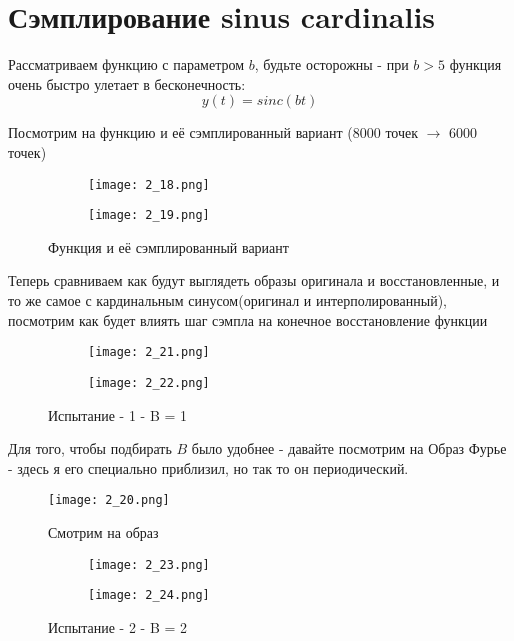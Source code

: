 \section{Сэмплирование sinus cardinalis} %

Рассматриваем функцию с параметром $b$, будьте осторожны - при $b>5$ функция очень быстро улетает в бесконечность:
$$y(t) = sinc(bt)$$

Посмотрим на функцию и её сэмплированный вариант (8000 точек $\rightarrow$ 6000 точек)

\begin{figure}[!ht]
	\centering
\hspace*{\fill}%
	\begin{subfigure}[b]{0.49\textwidth}
        \centering
		\texttt{[image: 2\_18.png]}
	\end{subfigure}
\hfill
	\begin{subfigure}[b]{0.49\textwidth}
        \centering
		\texttt{[image: 2\_19.png]}
	\end{subfigure}
    \caption{Функция и её сэмплированный вариант}
\end{figure}

Теперь сравниваем как будут выглядеть образы оригинала и восстановленные, и то же самое с кардинальным синусом(оригинал и интерполированный), посмотрим как будет влиять шаг сэмпла на конечное восстановление функции

\begin{figure}[!ht]
	\centering
\hspace*{\fill}%
	\begin{subfigure}[b]{0.49\textwidth}
        \centering
		\texttt{[image: 2\_21.png]}
	\end{subfigure}
\hfill
	\begin{subfigure}[b]{0.49\textwidth}
        \centering
		\texttt{[image: 2\_22.png]}
	\end{subfigure}
    \caption{ Испытание - 1 - B = 1}
\end{figure}
\newpage
Для того, чтобы подбирать $B$ было удобнее - давайте посмотрим на Образ Фурье - здесь я его специально приблизил, но так то он периодический.
\begin{figure}[ht]
    \centering
    \texttt{[image: 2\_20.png]}
	\caption{Смотрим на образ}
\end{figure}

\begin{figure}[!ht]
	\centering
\hspace*{\fill}%
	\begin{subfigure}[b]{0.49\textwidth}
        \centering
		\texttt{[image: 2\_23.png]}
	\end{subfigure}
\hfill
	\begin{subfigure}[b]{0.49\textwidth}
        \centering
		\texttt{[image: 2\_24.png]}
	\end{subfigure}
    \caption{ Испытание - 2 - B = 2}
\end{figure}

